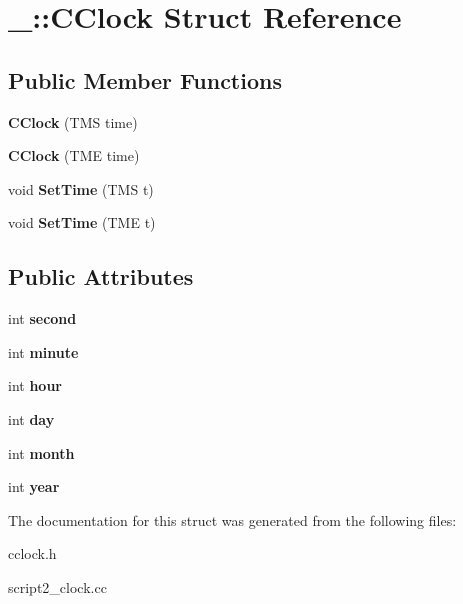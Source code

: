 \hypertarget{struct___1_1_c_clock}{}\section{\+\_\+\+:\+:C\+Clock Struct Reference}
\label{struct___1_1_c_clock}
\subsection*{Public Member Functions}
\begin{DoxyCompactItemize}
\item 
\mbox{\label{struct___1_1_c_clock_a82cca31e51f6cf9fab5deb4ebb47f817}} 
{\bfseries C\+Clock} (T\+MS time)
\item 
\mbox{\label{struct___1_1_c_clock_a5844dc98d153e1679b1c0a5f1fae94f8}} 
{\bfseries C\+Clock} (T\+ME time)
\item 
\mbox{\label{struct___1_1_c_clock_a006c8ffd330283924926bcfc3208e1b5}} 
void {\bfseries Set\+Time} (T\+MS t)
\item 
\mbox{\label{struct___1_1_c_clock_a6cb1ec6d1faf7939b8a6ac21684b708c}} 
void {\bfseries Set\+Time} (T\+ME t)
\end{DoxyCompactItemize}
\subsection*{Public Attributes}
\begin{DoxyCompactItemize}
\item 
\mbox{\label{struct___1_1_c_clock_ae46829f86685aa5d7d84fb0e8d7b3c77}} 
int {\bfseries second}
\item 
\mbox{\label{struct___1_1_c_clock_ab96039908c7bd47abf5e3970755c343d}} 
int {\bfseries minute}
\item 
\mbox{\label{struct___1_1_c_clock_a05b9992b1883ea5d70b121bc036c748e}} 
int {\bfseries hour}
\item 
\mbox{\label{struct___1_1_c_clock_a11f2cc83dd258f949ae0397f78dc66ef}} 
int {\bfseries day}
\item 
\mbox{\label{struct___1_1_c_clock_a35bb6160b6e523a82c249f63e88cb395}} 
int {\bfseries month}
\item 
\mbox{\label{struct___1_1_c_clock_a6c76e464b46a73ee6b177eed1bbf9335}} 
int {\bfseries year}
\end{DoxyCompactItemize}


The documentation for this struct was generated from the following files\+:\begin{DoxyCompactItemize}
\item 
cclock.\+h\item 
script2\+\_\+clock.\+cc\end{DoxyCompactItemize}
